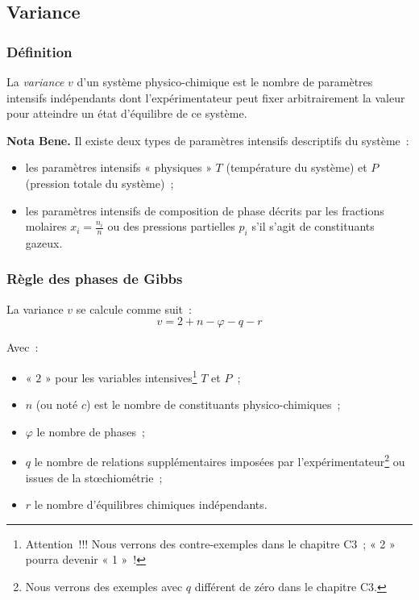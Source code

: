 \documentclass{article}
\begin{document}
\subsection{Variance}
\subsubsection{Définition}
\begin{enonce}
    La \textit{variance} $v$ d'un système physico-chimique est le nombre de paramètres intensifs indépendants dont l'expérimentateur peut fixer arbitrairement la valeur pour atteindre un état d'équilibre de ce système.\footnotemark{}
\end{enonce}
\textbf{Nota Bene.} Il existe deux types de paramètres intensifs descriptifs du système~:
\begin{itemize}
    \item les paramètres intensifs « physiques » $T$ (température du système) et $P$ (pression totale du système)~;
    \item les paramètres intensifs de composition de phase décrits par les fractions molaires $x_i=\frac{n_i}{n}$ ou des pressions partielles $p_i$ s'il s'agit de constituants gazeux.
\end{itemize}

\subsubsection{Règle des phases de Gibbs}
\begin{enonce}
    La variance $v$ se calcule comme suit~:
    $$v=2+n-\varphi-q-r$$
\end{enonce}
Avec~:
\begin{itemize}
    \item « $2$ » pour les variables intensives\footnote{Attention~!!! Nous verrons des contre-exemples dans le chapitre C3~; « 2 » pourra devenir « 1 »~!} $T$ et $P$~;
    \item $n$ (ou noté $c$) est le nombre de constituants physico-chimiques~;
    \item $\varphi$ le nombre de phases~;
    \item $q$ le nombre de relations supplémentaires imposées par l'expérimentateur\footnote{Nous verrons des exemples avec $q$ différent de zéro dans le chapitre C3.} ou issues de la stœchiométrie~;
    \item $r$ le nombre d'équilibres chimiques indépendants.
\end{itemize}
\end{document}
